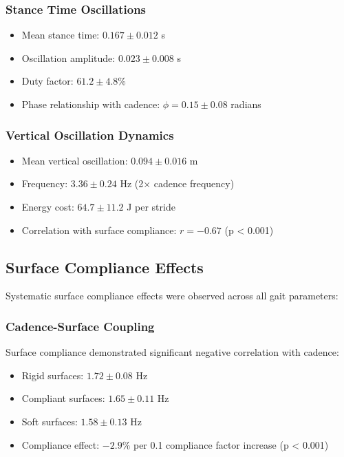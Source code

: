 \documentclass[12pt]{article}
\begin{document}
\subsubsection{Stance Time Oscillations}
\begin{itemize}
\item Mean stance time: $0.167 \pm 0.012$ s
\item Oscillation amplitude: $0.023 \pm 0.008$ s
\item Duty factor: $61.2 \pm 4.8$\%
\item Phase relationship with cadence: $\phi = 0.15 \pm 0.08$ radians
\end{itemize}

\subsubsection{Vertical Oscillation Dynamics}
\begin{itemize}
\item Mean vertical oscillation: $0.094 \pm 0.016$ m
\item Frequency: $3.36 \pm 0.24$ Hz (2× cadence frequency)
\item Energy cost: $64.7 \pm 11.2$ J per stride
\item Correlation with surface compliance: $r = -0.67$ (p < 0.001)
\end{itemize}

\subsection{Surface Compliance Effects}

Systematic surface compliance effects were observed across all gait parameters:

\subsubsection{Cadence-Surface Coupling}
Surface compliance demonstrated significant negative correlation with cadence:
\begin{itemize}
\item Rigid surfaces: $1.72 \pm 0.08$ Hz
\item Compliant surfaces: $1.65 \pm 0.11$ Hz  
\item Soft surfaces: $1.58 \pm 0.13$ Hz
\item Compliance effect: $-2.9\%$ per 0.1 compliance factor increase (p < 0.001)
\end{itemize}
\end{document}
